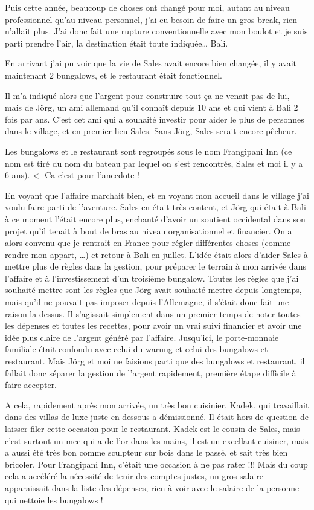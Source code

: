 Puis cette année, beaucoup de choses ont changé pour moi, autant au niveau professionnel qu’au niveau personnel, j’ai eu besoin de faire un gros break, rien n’allait plus. J’ai donc fait une rupture conventionnelle avec mon boulot et je suis parti prendre l’air, la destination était toute indiquée… Bali.

En arrivant j’ai pu voir que la vie de Sales avait encore bien changée, il y avait maintenant 2 bungalows, et le restaurant était fonctionnel.

Il m’a indiqué alors que l’argent pour construire tout ça ne venait pas de lui, mais de Jörg, un ami allemand qu’il connaît depuis 10 ans et qui vient à Bali 2 fois par ans. C’est cet ami qui a souhaité investir pour aider le plus de personnes dans le village, et en premier lieu Sales. Sans Jörg, Sales serait encore pêcheur.

Les bungalows et le restaurant sont regroupés sous le nom Frangipani Inn (ce nom est tiré du nom du bateau par lequel on s’est rencontrés, Sales et moi il y a 6 ans). <- Ca c’est pour l’anecdote !

En voyant que l’affaire marchait bien, et en voyant mon accueil dans le village j’ai voulu faire parti de l’aventure. Sales en était très content, et Jörg qui était à Bali à ce moment l’était encore plus, enchanté d’avoir un soutient occidental dans son projet qu’il tenait à bout de bras au niveau organisationnel et financier. On a alors convenu que je rentrait en France pour régler différentes choses (comme rendre mon appart, …) et retour à Bali en juillet. L’idée était alors d’aider Sales à mettre plus de règles dans la gestion, pour préparer le terrain à mon arrivée dans l’affaire et à l’investissement d’un troisième bungalow. Toutes les règles que j’ai souhaité mettre sont les règles que Jörg avait souhaité mettre depuis longtemps, mais qu’il ne pouvait pas imposer depuis l’Allemagne, il s’était donc fait une raison la dessus. Il s’agissait simplement dans un premier temps de noter toutes les dépenses et toutes les recettes, pour avoir un vrai suivi financier et avoir une idée plus claire de l’argent généré par l’affaire. Jusqu’ici, le porte-monnaie familiale était confondu avec celui du warung et celui des bungalows et restaurant. Mais Jörg et moi ne faisions parti que des bungalows et restaurant, il fallait donc séparer la gestion de l’argent rapidement, première étape difficile à faire accepter.

A cela, rapidement après mon arrivée, un très bon cuisinier, Kadek, qui travaillait dans des villas de luxe juste en dessous a démissionné. Il était hors de question de laisser filer cette occasion pour le restaurant. Kadek est le cousin de Sales, mais c’est surtout un mec qui a de l’or dans les mains, il est un excellant cuisiner, mais a aussi été très bon comme sculpteur sur bois dans le passé, et sait très bien bricoler. Pour Frangipani Inn, c’était une occasion à ne pas rater !!! Mais du coup cela a accéléré la nécessité de tenir des comptes justes, un gros salaire apparaissait dans la liste des dépenses, rien à voir avec le salaire de la personne qui nettoie les bungalows !

